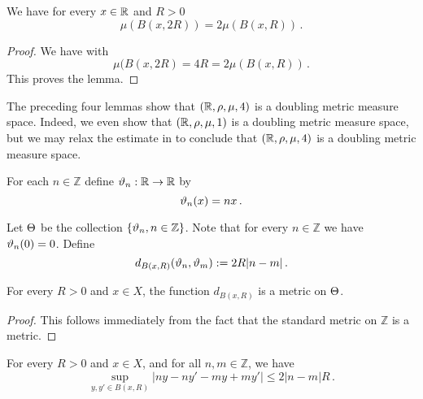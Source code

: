 \begin{lemma}
\label{real-line-doubling}
\leanok
{}
    We have for every $x\in {\mathbb{R}}$ and $R>0$
    \begin{equation}
        \mu(B(x,2R))=2\mu(B(x,R))\, .
    \end{equation}
\end{lemma}
\begin{proof}
    \leanok
    We have with 
\begin{equation}
    \mu(B(x,2R)=4R=2\mu(B(x,R))\, .
\end{equation}
This proves the lemma.
\end{proof}


The preceding four lemmas show that $({\mathbb{R}}, \rho, \mu, 4)$ is a doubling metric measure space. Indeed, we even show
that $({\mathbb{R}}, \rho, \mu, 1)$ is a doubling metric measure space, but we may relax the estimate in  to conclude that $({\mathbb{R}}, \rho, \mu, 4)$
is a doubling metric measure space.


For each $n\in \mathbb{Z}$ define
${\vartheta}_n:{\mathbb{R}}\to {\mathbb{R}}$ by
\begin{equation}
    {\vartheta}_n(x)=nx\, .
\end{equation}


Let ${\Theta}$ be the collection $\{{\vartheta}_n, n\in \mathbb{Z}\}$.
Note that for every $n\in \mathbb{Z}$ we have ${\vartheta}_n(0)=0$.
Define
\begin{equation}
    \label{eqcarl4}
    d_{B(x,R)}({\vartheta}_n, {\vartheta}_m) := 2R|n-m|\,.
\end{equation}

\begin{lemma}
    \label{frequency-metric}
    \leanok
    For every $R > 0$ and $x \in X$, the function $d_{B(x,R)}$ is a metric on ${\Theta}$.
\end{lemma}

\begin{proof}
    \leanok
    This follows immediately from the fact that the standard metric on $\mathbb{Z}$ is a metric.
\end{proof}

\begin{lemma}
\label{oscillation-control}
\leanok
{}
    For every $R > 0$ and $x \in X$, and for all $n, m \in \mathbb{Z}$, we have
    \begin{equation}\label{eqcarl2}
       \sup_{y,y'\in B(x,R)}|ny-ny'-my+my'|\le 2|n-m|R\, .
    \end{equation}
\end{lemma}

